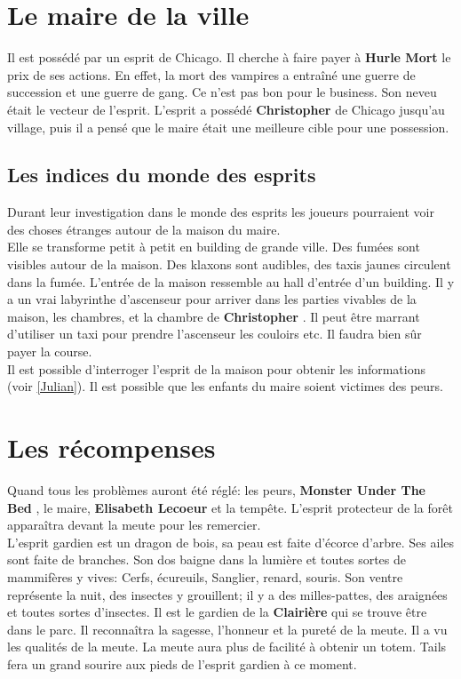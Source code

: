 \documentclass[oneside,12pt]{book}
\newcommand{\Peter}{\textbf{Hurle Mort} }
\newcommand{\Monster}{\textbf{Monster Under The Bed} }
\newcommand{\Elisabeth}{\textbf{Elisabeth Lecoeur} }
\newcommand{\Christopher}{\textbf{Christopher} }
\begin{document}
\begin{flushleft}
\section{Le maire de la ville}
\label{le_maire}
Il est possédé par un esprit de Chicago. Il cherche à faire payer à \Peter le prix de ses actions. En effet, la mort des vampires a entraîné une guerre de succession et une guerre de gang. Ce n'est pas bon pour le business. Son neveu était le vecteur de l'esprit.
L'esprit a possédé \Christopher de Chicago jusqu'au village, puis il a pensé que le maire était une meilleure cible pour une possession. \\
\subsection{Les indices du monde des esprits}
Durant leur investigation dans le monde des esprits les joueurs pourraient voir des choses étranges autour de la maison du maire. \\
Elle se transforme petit à petit en building de grande ville. Des fumées sont visibles autour de la maison. Des klaxons sont audibles, des taxis jaunes circulent dans la fumée. 
L'entrée de la maison ressemble au hall d'entrée d'un building. Il y a un vrai labyrinthe d’ascenseur pour arriver dans les parties vivables de la maison, les chambres, et la chambre de \Christopher. Il peut être marrant d'utiliser un taxi pour prendre l'ascenseur les couloirs etc. Il faudra bien sûr payer la course. \\
Il est possible d'interroger l'esprit de la maison pour obtenir les informations (voir \ref{Julian}). Il est possible que les enfants du maire soient victimes des peurs. 

\section{Les récompenses}
Quand  tous les problèmes auront été réglé: les peurs, \Monster, le maire, \Elisabeth et  la tempête. 
L'esprit protecteur de la forêt apparaîtra devant la meute pour les remercier. \\
L'esprit gardien est un dragon de bois, sa peau est faite d’écorce d'arbre. 
Ses ailes sont faite de branches. Son dos baigne dans la lumière et toutes sortes de mammifères y vives: 
Cerfs, écureuils, Sanglier, renard, souris. Son ventre représente la nuit, des insectes y grouillent; 
il y a des milles-pattes, des araignées et toutes sortes d'insectes.
Il est le gardien de la \textbf{Clairière} qui se trouve être dans le parc. 
Il reconnaîtra la sagesse, l'honneur et la pureté de la meute.
Il a vu les qualités de la meute. La meute aura plus de facilité à obtenir un totem.
Tails fera un grand sourire aux pieds de l'esprit gardien à ce moment.\\


\end{flushleft}
\end{document}
